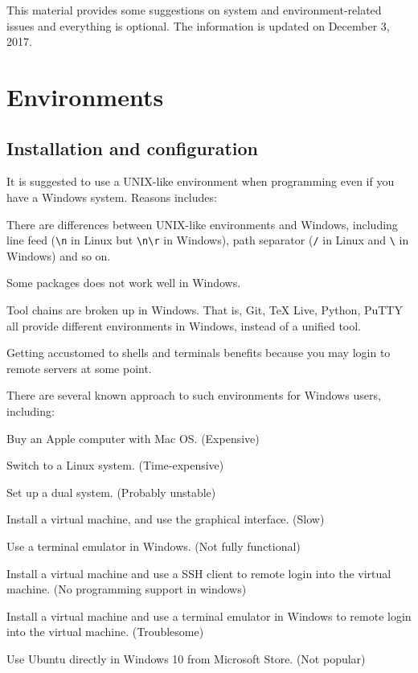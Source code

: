 \documentclass[english]{pkupaper}
\title{\titlemark}
\author{pppppass}
\date{\today}
\begin{document}
	\maketitle

This material provides some suggestions on system and environment-related issues and everything is optional. The information is updated on December 3, 2017.

\section{Environments}

\subsection{Installation and configuration}

It is suggested to use a UNIX-like environment when programming even if you have a Windows system. Reasons includes:
\begin{partlist}
\item There are differences between UNIX-like environments and Windows, including line feed (\verb"\n" in Linux but \verb"\n\r" in Windows), path separator (\verb"/" in Linux and \verb"\" in Windows) and so on.
\item Some packages does not work well in Windows.
\item Tool chains are broken up in Windows. That is, Git, TeX Live, Python, PuTTY all provide different environments in Windows, instead of a unified tool.
\item Getting accustomed to shells and terminals benefits because you may login to remote servers at some point.
\end{partlist}

There are several known approach to such environments for Windows users, including:
\begin{partlist}
\item Buy an Apple computer with Mac OS. (Expensive)
\item Switch to a Linux system. (Time-expensive)
\item Set up a dual system. (Probably unstable)
\item Install a virtual machine, and use the graphical interface. (Slow)
\item Use a terminal emulator in Windows. (Not fully functional)
\item Install a virtual machine and use a SSH client  to remote login into the virtual machine. (No programming support in windows)
\item Install a virtual machine and use a terminal emulator in Windows to remote login into the virtual machine. (Troublesome)
\item Use Ubuntu directly in Windows 10 from Microsoft Store. (Not popular)
\end{partlist}
\end{document}
